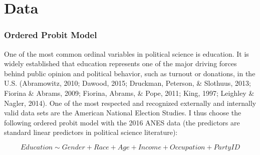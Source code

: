 \documentclass[12pt,econ]{sources/authesis}
\begin{document}
\hypertarget{ordblock-data}{%
\section{Data}\label{ordblock-data}}

\hypertarget{ordblock-data-opmodel}{%
\subsubsection{Ordered Probit Model}\label{ordblock-data-opmodel}}

One of the most common ordinal variables in political science is education. It is widely established that education represents one of the major driving forces behind public opinion and political behavior, such as turnout or donations, in the U.S. (Abramowitz, 2010; Dawood, 2015; Druckman, Peterson, \& Slothuus, 2013; Fiorina \& Abrams, 2009; Fiorina, Abrams, \& Pope, 2011; King, 1997; Leighley \& Nagler, 2014). One of the most respected and recognized externally and internally valid data sets are the American National Election Studies. I thus choose the following ordered probit model with the 2016 ANES data (the predictors are standard linear predictors in political science literature):

\vspace{-1cm}

\[Education \sim Gender + Race + Age + Income + Occupation + Party ID\]
\end{document}
